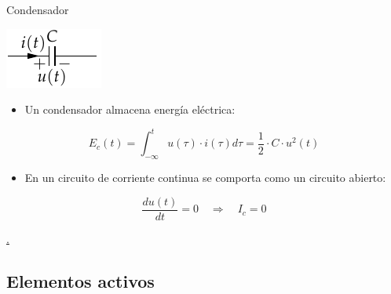 \documentclass[aspectratio=169, xcolor={usenames,svgnames,dvipsnames}]{beamer}
\begin{document}
\begin{frame}{Condensador}
    \begin{center}
    \includegraphics[height=0.2\textheight]{../figs/Condensador.pdf}
    \end{center}
    
    \begin{itemize}
    \item Un condensador almacena \alert{energía eléctrica}:
    \end{itemize}
    \[
      E_c(t) = \int_{-\infty}^t u(\tau) \cdot i(\tau) d\tau = \boxed{ \frac{1}{2} \cdot C \cdot u^2(t) }
    \]
    
    \begin{itemize}
    \item En un circuito de corriente continua se comporta como un \alert{circuito abierto}:
    \end{itemize}
    \begin{equation*}
      \frac{du(t)}{dt} = 0 \quad \Rightarrow \quad I_c = 0
    \end{equation*}

    \vspace{-3mm}
    \hyperlink{diapo:bobinas_serie}{.} %
\end{frame}


\subsection{Elementos activos}
\end{document}
